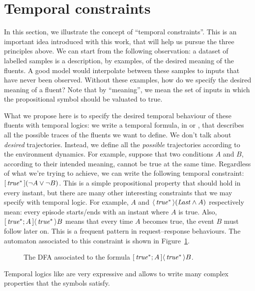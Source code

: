 \section{Temporal constraints}

\label{sec:temporal-constraints}

In this section, we illustrate the concept of ``temporal constraints''. This
is an important idea introduced with this work, that will help us pursue the
three principles above. We can start from the following observation: a dataset
of labelled samples is a description, by examples, of the desired meaning of
the fluents. A good model would interpolate between these samples to inputs
that have never been observed. Without these examples, how do we specify the
desired meaning of a fluent? Note that by ``meaning'', we mean the set of
inputs in which the propositional symbol should be valuated to true.

What we propose here is to specify the desired temporal behaviour of these
fluents with temporal logics: we write a temporal formula, in \ltl{} or
\ldl{}, that describes all the possible traces of the fluents we want to
define. We don't talk about \emph{desired} trajectories. Instead, we define
all the \emph{possible} trajectories according to the environment dynamics.
For example, suppose that two conditions $A$ and $B$, according to their
intended meaning, cannot be true at the same time. Regardless of what we're
trying to achieve, we can write the following temporal constraint:
$[\, {\text{\textit{true}}^*} \,](\neg A \lor \neg B)$.  This is a simple propositional
property that should hold in every instant, but there are many other
interesting constraints that we may specify with temporal logic. For example,
$A$ and $\langle\, {\text{\textit{true}}^*} \,\rangle(\text{\textit{Last}} \land A)$ respectively mean: every episode
starts/ends with an instant where $A$ is true.  Also, $[\, {\text{\textit{true}}^*;
A} \,]\langle\, {\text{\textit{true}}^*} \,\rangle B$ means that every time $A$ becomes true, the event $B$
must follow later on. This is a frequent pattern in request--response
behaviours. The automaton associated to this constraint is shown in
Figure~\ref{fig:response-automa}.
\begin{figure}
		\centering
		\caption{The DFA associated to the formula ${[\, {\text{\textit{true}}^*;
			A} \,]\langle\, {\text{\textit{true}}^*} \,\rangle B}$.}
		\label{fig:response-automa}
\end{figure}
Temporal logics like \ldl{} are very expressive and allows to write many
complex properties that the symbols satisfy.

